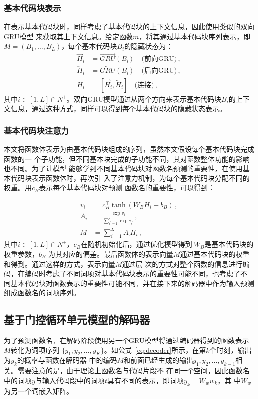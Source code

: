 \subsubsection{基本代码块表示}
在表示基本代码块时，同样考虑了基本代码块的上下文信息，因此使用类似的双向GRU模型
来获取其上下文信息。给定函数$m$，将其通过基本代码块序列表示，即$M = (B_1, \dots,
B_L)$，每个基本代码块$B_i$的隐藏状态为：
\begin{align}
    \overrightarrow{H}_i &= \overrightarrow{GRU}(B_{i}) 
\quad\text{(前向GRU)} \,, \\
    \overleftarrow{H}_i &= \overleftarrow{GRU}(B_i) 
\quad\text{(后向GRU)} \,, \\
    H_i &= [\overrightarrow{H}_i, \overleftarrow{H}_i] 
\quad\text{(连接)} \,,
\label{eq:block_encoder}
\end{align}
其中$i\in [1, L] \cap N^+$。双向GRU模型通过从两个方向来表示基本代码块$B_i$的上下
文信息，通过这种方式，同样可以得到每个基本代码块的隐藏状态表示。

\subsubsection{基本代码块注意力}
本文将函数体表示为由基本代码块组成的序列，虽然本文假设每个基本代码块完成函数的一
个子功能，但不同基本块完成的子功能不同，其对函数整体功能的影响也不同。为了让模型
能够学到不同基本代码块对函数名预测的重要性，在使用基本代码块表示函数体时，再次引
入了注意力机制，为每个基本代码块分配不同的权重。用$c_B$表示每个基本代码块对预测
函数名的重要性，可以得到：

\begin{align}
v_i &= c_B^\top \tanh(W_B H_i + b_B) \,, \\
A_i &= \frac{\exp{v_i}}{\sum_{i^\prime=1}^{L} \exp{v_{i^\prime}}} 
\,, \\
M &= \sum_{i=1}^{L} A_i H_i \,,
\label{eq:block_attn}
\end{align}
其中$i\in [1, L] \cap N^+$，$c_B$在随机初始化后，通过优化模型得到;$W_B$是基本代码块的权重参数，$b_B$
为其对应的偏差。最后函数体的表示向量$M$通过基本代码块的权重和得到。通过这样的方式，表示向量$M$通过层
次的方式对整个函数的信息进行编码，在编码时考虑了不同词项对基本代码块表示的重要性可能不同，也考虑了不
同基本代码块对函数表示的重要性可能不同，并在接下来的解码器中作为输入预测组成函数名的词项序列。

\subsection{基于门控循环单元模型的解码器}
为了预测函数名，在解码阶段使用另一个GRU模型将通过编码器得到的函数表示$M$转化为词项序列
$\{y_1,y_2,...,y_K\}$。如公式~\eqref{eq:decoder}所示，在第$k$个时刻，输出为$y_k$的概率与函数在解码器
中的编码$M$和前面已经生成的输出$y_1,y_2,...,y_{k-1}$相关。需要注意的是，由于理论上函数名与代码片段不
在同一个空间，因此函数名中的词项$y$与输入代码段中的词项$t$具有不同的表示，即词项$y_k = W_w w_k$，其
中$W_w$为另一个词嵌入矩阵。

